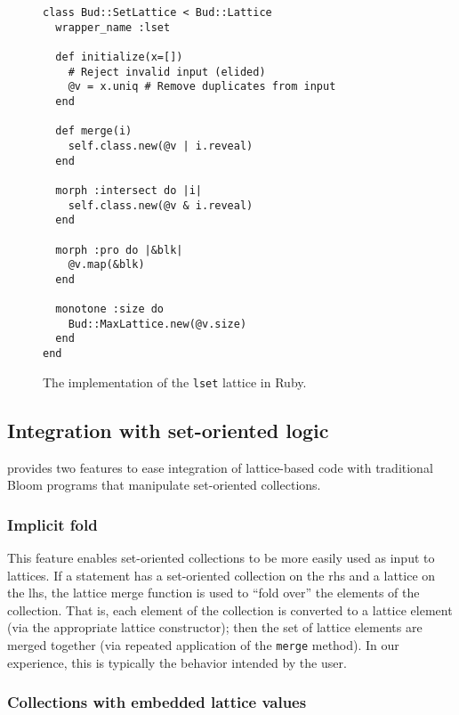 \begin{figure}[t]
\begin{scriptsize}
\begin{lstlisting}
class Bud::SetLattice < Bud::Lattice
  wrapper_name :lset

  def initialize(x=[])
    # Reject invalid input (elided)
    @v = x.uniq # Remove duplicates from input
  end

  def merge(i)
    self.class.new(@v | i.reveal)
  end

  morph :intersect do |i|
    self.class.new(@v & i.reveal)
  end

  morph :pro do |&blk|
    @v.map(&blk)
  end

  monotone :size do
    Bud::MaxLattice.new(@v.size)
  end
end
\end{lstlisting}
\end{scriptsize}
\caption{The implementation of the \texttt{lset} lattice in Ruby.}
\label{fig:lattice-set}
\end{figure}

\subsection{Integration with set-oriented logic}
\label{sec:bloom-interop}
\lang provides two features to ease integration of lattice-based code with
traditional Bloom programs that manipulate set-oriented collections.

\subsubsection{Implicit fold}
This feature enables set-oriented collections to be more easily used as input to
lattices. If a \lang statement has a set-oriented collection on the rhs and a lattice
on the lhs, the lattice merge function is used to ``fold over'' the elements of
the collection. That is, each element of the collection is converted to a
lattice element (via the appropriate lattice constructor); then the set of
lattice elements are merged together (via repeated application of the
\texttt{merge} method). In our experience, this is typically the behavior
intended by the user.

\subsubsection{Collections with embedded lattice values}
\label{sec:lattice-embedding}

